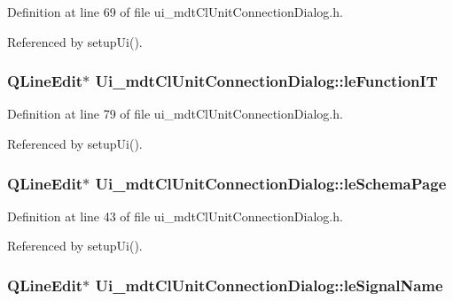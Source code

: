 Definition at line 69 of file ui\-\_\-mdt\-Cl\-Unit\-Connection\-Dialog.\-h.



Referenced by setup\-Ui().

\hypertarget{class_ui__mdt_cl_unit_connection_dialog_a08b5e75498912c05295edcd6679bf56f}{
\subsubsection[{le\-Function\-I\-T}]{\setlength{\rightskip}{0pt plus 5cm}Q\-Line\-Edit$\ast$ Ui\-\_\-mdt\-Cl\-Unit\-Connection\-Dialog\-::le\-Function\-I\-T}}\label{class_ui__mdt_cl_unit_connection_dialog_a08b5e75498912c05295edcd6679bf56f}


Definition at line 79 of file ui\-\_\-mdt\-Cl\-Unit\-Connection\-Dialog.\-h.



Referenced by setup\-Ui().

\hypertarget{class_ui__mdt_cl_unit_connection_dialog_adb2ea9dde20a9d7769c7741ca439511b}{
\subsubsection[{le\-Schema\-Page}]{\setlength{\rightskip}{0pt plus 5cm}Q\-Line\-Edit$\ast$ Ui\-\_\-mdt\-Cl\-Unit\-Connection\-Dialog\-::le\-Schema\-Page}}\label{class_ui__mdt_cl_unit_connection_dialog_adb2ea9dde20a9d7769c7741ca439511b}


Definition at line 43 of file ui\-\_\-mdt\-Cl\-Unit\-Connection\-Dialog.\-h.



Referenced by setup\-Ui().

\hypertarget{class_ui__mdt_cl_unit_connection_dialog_aae843ac09a6334f90d2956aad37697ed}{
\subsubsection[{le\-Signal\-Name}]{\setlength{\rightskip}{0pt plus 5cm}Q\-Line\-Edit$\ast$ Ui\-\_\-mdt\-Cl\-Unit\-Connection\-Dialog\-::le\-Signal\-Name}}\label{class_ui__mdt_cl_unit_connection_dialog_aae843ac09a6334f90d2956aad37697ed}


